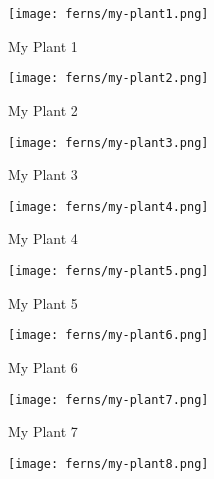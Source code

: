 \begin{figure}[tbh]
\begin{center}
	\begin{subfigure}[tbh]{0.23\textwidth}
	\begin{center}
	\texttt{[image: ferns/my-plant1.png]}
	\caption{My Plant 1}
	\end{center}
	\end{subfigure}
\hfill
	\begin{subfigure}[tbh]{0.23\textwidth}
	\begin{center}
	\texttt{[image: ferns/my-plant2.png]}
	\caption{My Plant 2}
	\end{center}
	\end{subfigure}
\hfill
	\begin{subfigure}[tbh]{0.23\textwidth}
	\begin{center}
	\texttt{[image: ferns/my-plant3.png]}
	\caption{My Plant 3}
	\end{center}
	\end{subfigure}
\hfill
	\begin{subfigure}[tbh]{0.23\textwidth}
	\begin{center}
	\texttt{[image: ferns/my-plant4.png]}
	\caption{My Plant 4}
	\end{center}
	\end{subfigure}
\hfill
	\begin{subfigure}[tbh]{0.23\textwidth}
	\begin{center}
	\texttt{[image: ferns/my-plant5.png]}
	\caption{My Plant 5}
	\end{center}
	\end{subfigure}
\hfill
	\begin{subfigure}[tbh]{0.23\textwidth}
	\begin{center}
	\texttt{[image: ferns/my-plant6.png]}
	\caption{My Plant 6}
	\end{center}
	\end{subfigure}
\hfill
	\begin{subfigure}[tbh]{0.23\textwidth}
	\begin{center}
	\texttt{[image: ferns/my-plant7.png]}
	\caption{My Plant 7}
	\end{center}
	\end{subfigure}
\hfill
	\begin{subfigure}[tbh]{0.23\textwidth}
	\begin{center}
	\texttt{[image: ferns/my-plant8.png]}

\end{center}
\end{subfigure}
\end{center}
\end{figure}

